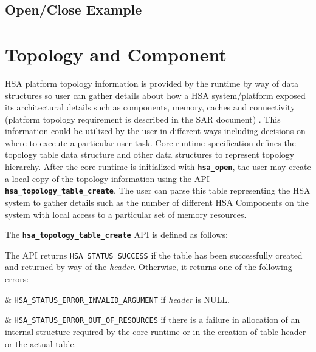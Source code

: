 \documentclass{book}
\newcommand{\diffblock}[1]{#1}
\newcommand{\ttbf}[1]{\diffblock{\texttt{\textbf{#1}}}}
\newcommand{\dbtt}[1]{\diffblock{\texttt{#1}}}
\begin{document}
\subsection{Open/Close Example}



\hypertarget{component}{}\section{Topology and Component
}\label{topology}
HSA platform topology information is provided by the runtime by way of
data structures so user can gather details about how a HSA
system/platform exposed its architectural details such as
components, memory, caches and connectivity (platform topology
requirement is described in the SAR document)
. This information
could be utilized by the user in different ways including decisions
on where to execute a particular user task. Core runtime
specification defines the topology table data structure and other
data structures to represent topology hierarchy.  After the core
runtime is initialized with \ttbf{hsa\_open}, the user may create a
local copy of the topology information using the API
\ttbf{hsa\_topology\_table\_create}. The user can parse this table
representing the HSA system to gather details such as the number of
different HSA Components on the system with local access to a
particular set of memory resources.


The \ttbf{hsa\_topology\_table\_create} API is defined as follows:



The API returns \dbtt{HSA\_STATUS\_SUCCESS} if the table has been
successfully created and returned by way of the {\itshape header}. Otherwise,
it returns one of the following errors:

\begin{easylist}
& \dbtt{HSA\_STATUS\_ERROR\_INVALID\_ARGUMENT} if {\itshape header}
is NULL.

& \dbtt{HSA\_STATUS\_ERROR\_OUT\_OF\_RESOURCES} if there is a failure
in allocation of an internal structure required by the core runtime
or in the creation of table header or the actual table.
\end{easylist}
\end{document}
